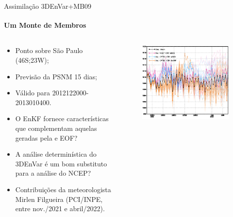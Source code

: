 \documentclass[10pt,aspectratio=169]{beamer}
\begin{document}
\begin{frame}{Assimilação 3DEnVar+MB09}
\framesubtitle{Um Monte de Membros}
  \begin{columns}[t]
    \begin{column}{.5\textwidth}
   	  \vspace{-1.5em}
    	\begin{itemize}
        \item Ponto sobre São Paulo (46S;23W);
        \item Previsão da PSNM 15 dias;
        \item Válido para 2012122000-2013010400.
    	\end{itemize}
    	\vspace{1em}
    	\begin{itemize}
			  \item O EnKF fornece características que complementam aquelas geradas pela e EOF? 
				\item A análise determinística do 3DEnVar é um bom substituto para a análise do NCEP?
				\item Contribuições da meteorologista Mirlen Filgueira (PCI/INPE, entre nov./2021 e abril/2022).
			\end{itemize}
    \end{column}
    \begin{column}{.5\textwidth}
      \vspace{-2em}
			\begin{figure}[t]
			  \centering
			  \includegraphics[width=1.\linewidth]{./figs/spaguete71.png}
			\end{figure}
    \end{column}
  \end{columns}
\end{frame}
\end{document}
